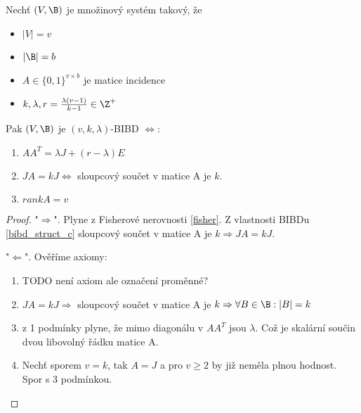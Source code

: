 \begin{theorem}\label{bibd_equiv}
	Nechť $(V, \B)$ je množinový systém takový, že
	\begin{itemize}
		\item $|V| = v$
		\item $|\B| = b$
		\item $A \in \{ 0, 1\}^{v \times b}$ je matice incidence
		\item $k, \lambda, r = \frac{\lambda (v - 1)}{k - 1} \in \Z^+$
	\end{itemize}
	Pak $(V, \B)$ je $(v, k, \lambda)$-BIBD $\iff$:
	\begin{enumerate}
		\item $AA^T = \lambda J + (r - \lambda)E$
		\item $JA = kJ \iff$ sloupcový součet v matice A je $k$.
		\item $rank A = v$
	\end{enumerate}
\end{theorem}
\begin{proof}
	"$\Rightarrow$". Plyne z Fisherové nerovnosti \cref{fisher}.
	Z vlastnosti BIBDu \cref{bibd_struct_c} sloupcový součet v matice A je $k \Rightarrow JA = kJ$.

	"$\Leftarrow$". Ověříme axiomy:
	\begin{enumerate}
		\item TODO není axiom ale označení proměnné?
		\item $JA = kJ \Rightarrow$ sloupcový součet v matice A je $k \Rightarrow \forall B \in \B: |B| = k$
		\item z 1 podmínky plyne, že mimo diagonálu v $AA^T$ jsou $\lambda$.
			Což je skalární součin dvou libovolný řádku matice A.
		\item Nechť sporem $v = k$, tak $A = J$ a pro $v \geq 2$ by již neměla plnou hodnost.
			Spor s 3 podmínkou.
	\end{enumerate}

\end{proof}

